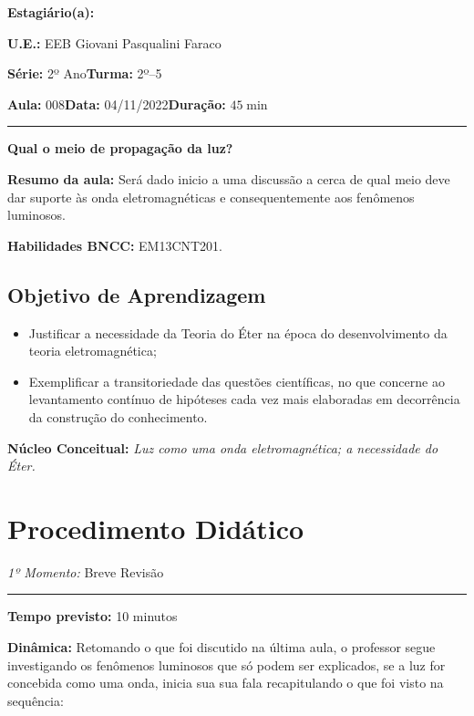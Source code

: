     \noindent \textbf{Estagiário(a): }\imprimirautor 
    
    \noindent \textbf{U.E.: }EEB Giovani Pasqualini Faraco
    
    \noindent \textbf{Série: }2º Ano\hfill{}\textbf{Turma: }2º--5
    
    \noindent \textbf{Aula:} 008\hfill{}\textbf{Data:} 04/11/2022\hfill{}\textbf{Duração:} $45\min$
    \rule{\textwidth}{.5pt}
    \bigskip{}  
    

    \noindent
    \begin{center}
      \textbf{Qual o meio de propagação da luz?}
    \par\end{center}
    \smallskip{}
    \noindent \textbf{Resumo da aula:} Será dado inicio a uma discussão a cerca de qual meio deve dar suporte às onda eletromagnéticas e consequentemente aos fenômenos luminosos.
    \medskip{}
    \par\noindent \textbf{Habilidades BNCC:} EM13CNT201.
    \bigskip{}
    \subsection*{Objetivo de Aprendizagem}
    \begin{itemize}
        \item Justificar a necessidade da Teoria do Éter na época do desenvolvimento da teoria eletromagnética;
        \item Exemplificar a transitoriedade das questões científicas, no que concerne ao levantamento contínuo de hipóteses cada vez mais elaboradas em decorrência da construção do conhecimento.
    \end{itemize}    
    \smallskip{}    
    \noindent \textbf{Núcleo Conceitual:} \emph{Luz como uma onda eletromagnética; a necessidade do Éter.}
    \newpage
    

    \section*{Procedimento Didático} 
    \noindent\emph{1º Momento:} Breve Revisão
    \par\noindent\rule{.3\textwidth}{.5pt}  
    \par\noindent\textbf{Tempo previsto:} 10 minutos
    \smallskip
    \par\noindent\textbf{Dinâmica:} Retomando o que foi discutido na última aula, o professor segue investigando os fenômenos luminosos que só podem ser explicados, se a luz for concebida como uma onda, inicia sua sua fala recapitulando o que foi visto na sequência:

